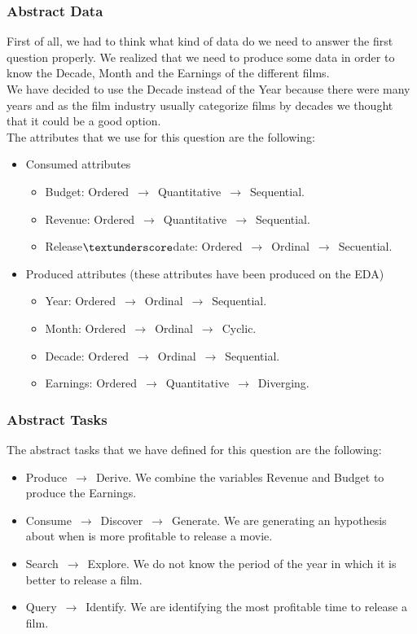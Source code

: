\subsubsection{Abstract Data}

First of all, we had to think what kind of data do we need to answer the first question properly. We realized that we need to produce some data in order to know the Decade, Month and the Earnings of the different films.\\

We have decided to use the Decade instead of the Year because there were many years and as the film industry usually categorize films by decades we thought that it could be a good option.\\

The attributes that we use for this question are the following:

\begin{itemize}
	\item Consumed attributes
		\begin{itemize}
			\item Budget: Ordered $\,\to\,$ Quantitative $\,\to\,$ Sequential.
			\item Revenue: Ordered $\,\to\,$ Quantitative $\,\to\,$ Sequential.
			\item Release$\textunderscore$date: Ordered $\,\to\,$ Ordinal $\,\to\,$ Secuential.
		\end{itemize}
	\item Produced attributes (these attributes have been produced on the EDA)
		\begin{itemize}
			\item Year: Ordered $\,\to\,$ Ordinal $\,\to\,$ Sequential.
			\item Month: Ordered $\,\to\,$ Ordinal $\,\to\,$ Cyclic.
			\item Decade: Ordered $\,\to\,$ Ordinal $\,\to\,$ Sequential.
			\item Earnings: Ordered $\,\to\,$ Quantitative $\,\to\,$ Diverging.
		\end{itemize}
\end{itemize}

\subsubsection{Abstract Tasks}

The abstract tasks that we have defined for this question are the following:

\begin{itemize}
	\item Produce $\,\to\,$ Derive. We combine the variables Revenue and Budget to produce the Earnings.
	\item Consume $\,\to\,$ Discover $\,\to\,$ Generate. We are generating an hypothesis about when is more profitable to release a movie.
	\item Search $\,\to\,$ Explore. We do not know the period of the year in which it is better to release a film.
	\item Query $\,\to\,$ Identify. We are identifying the most profitable time to release a film.
\end{itemize}

